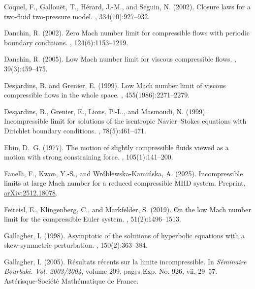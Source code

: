 \documentclass[11pt, twoside, a4paper]{article}
\theoremstyle{plain}
\theoremstyle{remark}
\numberwithin{equation}{section}
\begin{document}
\begin{thebibliography}{}
Coquel, F., Gallou\"et, T., H\'erard, J.-M., and Seguin, N. (2002).
\newblock Closure laws for a two-fluid two-pressure model.
, 334(10):927--932.

Danchin, R. (2002).
\newblock Zero {M}ach number limit for compressible flows with periodic
  boundary conditions.
, 124(6):1153--1219.

Danchin, R. (2005).
\newblock Low {M}ach number limit for viscous compressible flows.
, 39(3):459--475.

Desjardins, B. and Grenier, E. (1999).
\newblock Low {M}ach number limit of viscous compressible flows in the whole
  space.
,
  455(1986):2271--2279.

Desjardins, B., Grenier, E., Lions, P.-L., and Masmoudi, N. (1999).
\newblock Incompressible limit for solutions of the isentropic
  {N}avier--{S}tokes equations with {D}irichlet boundary conditions.
, 78(5):461--471.

Ebin, D.~G. (1977).
\newblock The motion of slightly compressible fluids viewed as a motion with
  strong constraining force.
, 105(1):141--200.

Fanelli, F., Kwon, Y.-S., and Wr{\'o}blewska-Kami{\'n}ska, A. (2025).
\newblock Incompressible limits at large {M}ach number for a reduced
  compressible {MHD} system.
\newblock Preprint, \href{https://arxiv.org/abs/2512.18078}{arXiv:2512.18078}.

Feireisl, E., Klingenberg, C., and Markfelder, S. (2019).
\newblock On the low {M}ach number limit for the compressible {E}uler system.
, 51(2):1496--1513.

Gallagher, I. (1998).
\newblock Asymptotic of the solutions of hyperbolic equations with a
  skew-symmetric perturbation.
, 150(2):363--384.

Gallagher, I. (2005).
\newblock R\'esultats r\'ecents sur la limite incompressible.
\newblock In {\em S\'eminaire Bourbaki. Vol. 2003/2004}, volume 299, pages Exp.
  No. 926, vii, 29--57. Ast\'erisque-Soci{\'e}t{\'e} Math{\'e}matique de
  France.


\end{thebibliography}
\end{document}
